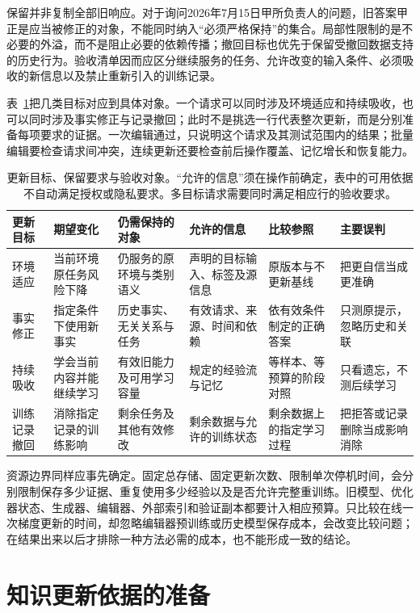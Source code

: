 保留并非复制全部旧响应。对于询问2026年7月15日甲所负责人的问题，旧答案甲正是应当被修正的对象，不能同时纳入“必须严格保持”的集合。局部性限制的是不必要的外溢，而不是阻止必要的依赖传播；撤回目标也优先于保留受撤回数据支持的历史行为。验收清单因而应区分继续服务的任务、允许改变的输入条件、必须吸收的新信息以及禁止重新引入的训练记录。

表~\ref{tab:ket-update-goals}把几类目标对应到具体对象。一个请求可以同时涉及环境适应和持续吸收，也可以同时涉及事实修正与记录撤回；此时不是挑选一行代表整次更新，而是分别准备每项要求的证据。一次编辑通过，只说明这个请求及其测试范围内的结果；批量编辑要检查请求间冲突，连续更新还要检查前后操作覆盖、记忆增长和恢复能力。

\begin{table}[htbp]
\small
\begin{tabularx}{\linewidth}{@{}p{16mm}XXXXX@{}}
\toprule
更新目标 & 期望变化 & 仍需保持的对象 & 允许的信息 & 比较参照 & 主要误判 \\
\midrule
环境适应 & 当前环境原任务风险下降 & 仍服务的原环境与类别语义 & 声明的目标输入、标签及源信息 & 原版本与不更新基线 & 把更自信当成更准确 \\
事实修正 & 指定条件下使用新事实 & 历史事实、无关关系与任务 & 有效请求、来源、时间和依赖 & 依有效条件制定的正确答案 & 只测原提示，忽略历史和关联 \\
持续吸收 & 学会当前内容并能继续学习 & 有效旧能力及可用学习容量 & 规定的经验流与记忆 & 等样本、等预算的阶段对照 & 只看遗忘，不测后续学习 \\
训练记录撤回 & 消除指定记录的训练影响 & 剩余任务及其他有效修改 & 剩余数据与允许的训练状态 & 剩余数据上的指定学习过程 & 把拒答或记录删除当成影响消除 \\
\bottomrule
\end{tabularx}
\caption{更新目标、保留要求与验收对象。“允许的信息”须在操作前确定，表中的可用依据不自动满足授权或隐私要求。多目标请求需要同时满足相应行的验收要求。}
\label{tab:ket-update-goals}
\end{table}

资源边界同样应事先确定。固定总存储、固定更新次数、限制单次停机时间，会分别限制保存多少证据、重复使用多少经验以及是否允许完整重训练。旧模型、优化器状态、生成器、编辑器、外部索引和验证副本都要计入相应预算。只比较在线一次梯度更新的时间，却忽略编辑器预训练或历史模型保存成本，会改变比较问题；在结果出来以后才排除一种方法必需的成本，也不能形成一致的结论。

\section{知识更新依据的准备}
\label{sec:ket-update-evidence}

